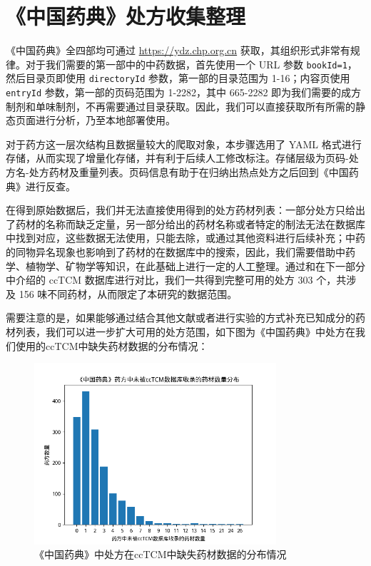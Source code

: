 \section{《中国药典》处方收集整理}

《中国药典》全四部均可通过 \url{https://ydz.chp.org.cn} 获取，其组织形式非常有规律。对于我们需要的第一部中的中药数据，首先使用一个 URL 参数 \texttt{bookId=1}，然后目录页即使用 \texttt{directoryId} 参数，第一部的目录范围为 1-16；内容页使用 \texttt{entryId} 参数，第一部的页码范围为 1-2282，其中 665-2282 即为我们需要的成方制剂和单味制剂，不再需要通过目录获取。因此，我们可以直接获取所有所需的静态页面进行分析，乃至本地部署使用。

对于药方这一层次结构且数据量较大的爬取对象，本步骤选用了 YAML 格式进行存储，从而实现了增量化存储，并有利于后续人工修改标注。存储层级为页码-处方名-处方药材及重量列表。页码信息有助于在归纳出热点处方之后回到《中国药典》进行反查。

在得到原始数据后，我们并无法直接使用得到的处方药材列表：一部分处方只给出了药材的名称而缺乏定量，另一部分给出的药材名称或者特定的制法无法在数据库中找到对应，这些数据无法使用，只能去除，或通过其他资料进行后续补充；中药的同物异名现象也影响到了药材的在数据库中的搜索，因此，我们需要借助中药学、植物学、矿物学等知识，在此基础上进行一定的人工整理。通过和在下一部分中介绍的 ccTCM 数据库进行对比，我们一共得到完整可用的处方 303 个，共涉及 156 味不同药材，从而限定了本研究的数据范围。

需要注意的是，如果能够通过结合其他文献或者进行实验的方式补充已知成分的药材列表，我们可以进一步扩大可用的处方范围，如下图为《中国药典》中处方在我们使用的ccTCM中缺失药材数据的分布情况：

\begin{figure}[H]
  \centering
  \includegraphics[width=0.8\textwidth]{figures/unlisted_medicinals_distribution.png}
  \caption{《中国药典》中处方在ccTCM中缺失药材数据的分布情况}
  \label{fig:missing_herbs}
\end{figure}

